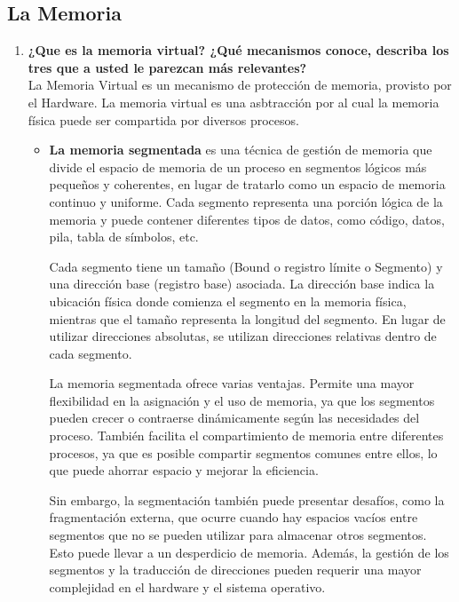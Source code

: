 \documentclass[../main.tex]{subfiles}
\begin{document}
    \subsection*{La Memoria}
        \begin{enumerate}
            \item 
                \textbf{¿Que es la memoria virtual? ¿Qué mecanismos conoce, describa los tres que a usted le parezcan más relevantes?}\\
                La Memoria Virtual es un mecanismo de protección de memoria, provisto por el Hardware. La memoria virtual es una asbtracción por al cual la memoria física puede ser compartida por diversos procesos.
                \begin{itemize}
                    \item 
                        \textbf{La memoria segmentada} es una técnica de gestión de memoria que divide el espacio de memoria de un proceso en segmentos lógicos más pequeños y coherentes, en lugar de tratarlo como un espacio de memoria continuo y uniforme. Cada segmento representa una porción lógica de la memoria y puede contener diferentes tipos de datos, como código, datos, pila, tabla de símbolos, etc.

                        Cada segmento tiene un tamaño (Bound o registro límite o Segmento) y una dirección base (registro base) asociada. La dirección base indica la ubicación física donde comienza el segmento en la memoria física, mientras que el tamaño representa la longitud del segmento. En lugar de utilizar direcciones absolutas, se utilizan direcciones relativas dentro de cada segmento.
                        
                        La memoria segmentada ofrece varias ventajas. Permite una mayor flexibilidad en la asignación y el uso de memoria, ya que los segmentos pueden crecer o contraerse dinámicamente según las necesidades del proceso. También facilita el compartimiento de memoria entre diferentes procesos, ya que es posible compartir segmentos comunes entre ellos, lo que puede ahorrar espacio y mejorar la eficiencia.
                        
                        Sin embargo, la segmentación también puede presentar desafíos, como la fragmentación externa, que ocurre cuando hay espacios vacíos entre segmentos que no se pueden utilizar para almacenar otros segmentos. Esto puede llevar a un desperdicio de memoria. Además, la gestión de los segmentos y la traducción de direcciones pueden requerir una mayor complejidad en el hardware y el sistema operativo.
                        

\end{itemize}
\end{enumerate}
\end{document}
